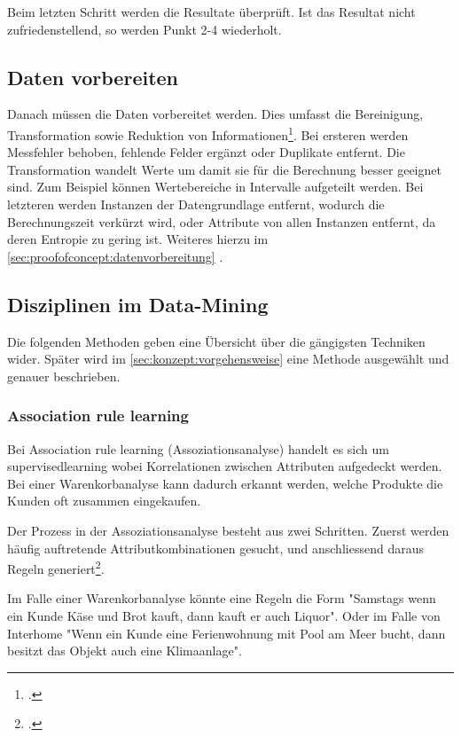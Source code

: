 Beim letzten Schritt werden die Resultate überprüft. Ist das Resultat nicht zufriedenstellend, so werden Punkt 2-4 wiederholt.

\subsection{Daten vorbereiten}
\label{sec:recherche:dataminingtechniken:datenvorbereiten}

Danach müssen die Daten vorbereitet werden. Dies umfasst die Bereinigung, Transformation sowie Reduktion von Informationen\footcite{feature_selection_2017-01-04}. Bei ersteren werden Messfehler behoben, fehlende Felder ergänzt oder Duplikate entfernt. Die Transformation wandelt Werte um damit sie für die Berechnung besser geeignet sind. Zum Beispiel können Wertebereiche in Intervalle aufgeteilt werden. Bei letzteren werden Instanzen der Datengrundlage entfernt, wodurch die Berechnungszeit verkürzt wird, oder Attribute von allen Instanzen entfernt, da deren Entropie zu gering ist. Weiteres hierzu im \cref{sec:proofofconcept:datenvorbereitung} . 


\subsection{Disziplinen im Data-Mining}
\label{sec:recherche:dataminingtechniken:disziplinen}
Die folgenden Methoden geben eine Übersicht über die gängigsten Techniken wider. Später wird im \cref{sec:konzept:vorgehensweise}  eine Methode ausgewählt und genauer beschrieben. 

\subsubsection{Association rule learning}
Bei Association rule learning (Assoziationsanalyse) handelt es sich um \gls{supervisedlearning} wobei Korrelationen zwischen Attributen aufgedeckt werden. Bei einer Warenkorbanalyse kann dadurch erkannt werden, welche Produkte die Kunden oft zusammen eingekaufen.

Der Prozess in der Assoziationsanalyse besteht aus zwei Schritten. Zuerst werden häufig auftretende Attributkombinationen gesucht, und anschliessend daraus Regeln generiert\footcite{association_rule_learning_2017-01-05}.

Im Falle einer Warenkorbanalyse könnte eine Regeln die Form "Samstags wenn ein Kunde Käse und Brot kauft, dann kauft er auch Liquor". Oder im Falle von Interhome "Wenn ein Kunde eine Ferienwohnung mit Pool am Meer bucht, dann besitzt das Objekt auch eine Klimaanlage".


